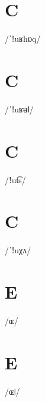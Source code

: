 \documentclass[10pt,a4paper,twoside]{book}
\begin{document}
\section*{C}

\begin{multicols}{3}
 {/ˈǃuʁhɒq/} {}
\end{multicols}

\section*{C}

\begin{multicols}{3}
 {/ˈǃuʁʉǁ/} {}
\end{multicols}

\section*{C}

\begin{multicols}{3}
 {/ǃut͡s/} {}
\end{multicols}

\section*{C}

\begin{multicols}{3}
 {/ˈǃuχʌ/} {}
\end{multicols}

\section*{E}

\begin{multicols}{3}
 {/ɶ/} {}
\end{multicols}

\section*{E}

\begin{multicols}{3}
 {/ɶǀ/} {}
\end{multicols}
\end{document}
